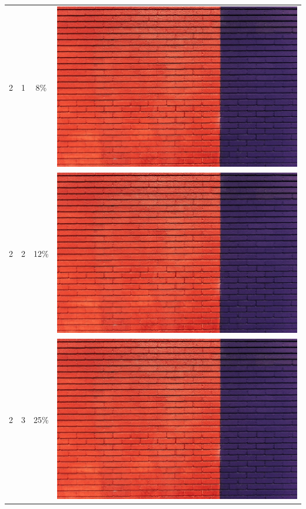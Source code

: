 \documentclass[times, utf8, seminar]{fer}
\begin{document}
\begin{center}
\begin{longtable}{|c|c|c|c|}
2 & 1 &8\% & \includegraphics[scale=0.3]{../benchmark_results/pattern/2_components-1_bits.png} \\
2 & 2 &12\% & \includegraphics[scale=0.3]{../benchmark_results/pattern/2_components-2_bits.png} \\
2 & 3 &25\% & \includegraphics[scale=0.3]{../benchmark_results/pattern/2_components-3_bits.png} \\

\end{longtable}
\end{center}
\end{document}
